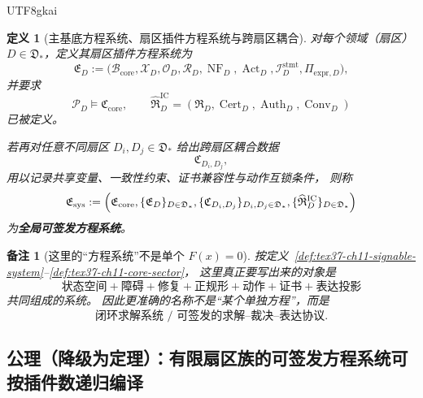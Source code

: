 \documentclass[12pt]{article}
\newtheorem{definition}{定义}[section]
\newtheorem{remark}{备注}[section]
\newcommand{\Cert}{\operatorname{Cert}}
\newcommand{\Auth}{\operatorname{Auth}}
\newcommand{\Conv}{\operatorname{Conv}}
\begin{document}
\begin{CJK*}{UTF8}{gkai}
\begin{definition}[主基底方程系统、扇区插件方程系统与跨扇区耦合]
对每个领域（扇区）$D\in\mathfrak D_*$，定义其扇区插件方程系统为
\[
  \mathfrak E_D
  :=
  \bigl(
    \mathcal B_{\mathrm{core}},
    \mathcal X_D,
    \mathcal O_D,
    \mathcal R_D,
    \operatorname{NF}_D,
    \operatorname{Act}_D,
    \mathcal I_D^{\mathrm{stmt}},
    \Pi_{\mathrm{expr},D}
  \bigr),
\]
并要求
\[
  \mathcal P_D\models \mathfrak C_{\mathrm{core}},
  \qquad
  \widehat{\mathfrak R}_D^{\mathrm{IC}}
  =
  (\mathfrak R_D,\Cert_D,\Auth_D,\Conv_D)
\]
已被定义。

若再对任意不同扇区 $D_i,D_j\in\mathfrak D_*$ 给出跨扇区耦合数据
\[
  \mathfrak C_{D_i,D_j},
\]
用以记录共享变量、一致性约束、证书兼容性与动作互锁条件，
则称
\[
  \mathfrak E_{\mathrm{sys}}
  :=
  \Bigl(
    \mathfrak E_{\mathrm{core}},
    \{\mathfrak E_D\}_{D\in\mathfrak D_*},
    \{\mathfrak C_{D_i,D_j}\}_{D_i,D_j\in\mathfrak D_*},
    \{\widehat{\mathfrak R}_D^{\mathrm{IC}}\}_{D\in\mathfrak D_*}
  \Bigr)
\]
为\textbf{全局可签发方程系统}。
\end{definition}

\begin{remark}[这里的“方程系统”不是单个 $F(x)=0$]
按定义~\ref{def:tex37-ch11-signable-system}--\ref{def:tex37-ch11-core-sector}，
这里真正要写出来的对象是
\[
  \text{状态空间}
  +
  \text{障碍}
  +
  \text{修复}
  +
  \text{正规形}
  +
  \text{动作}
  +
  \text{证书}
  +
  \text{表达投影}
\]
共同组成的系统。
因此更准确的名称不是“某个单独方程”，而是
\[
  \boxed{
    \text{闭环求解系统 / 可签发的求解--裁决--表达协议}
  }.
\]
\end{remark}

\subsection{公理（降级为定理）：有限扇区族的可签发方程系统可按插件数递归编译}
\label{subsec:tex37-ch11-axiom}


\end{CJK*}
\end{document}
